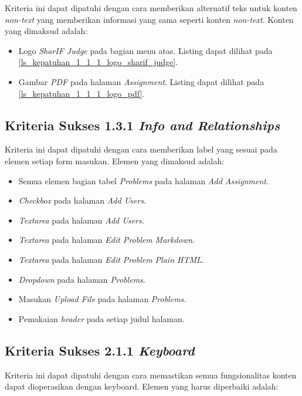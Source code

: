 Kriteria ini dapat dipatuhi dengan cara memberikan alternatif teks untuk konten \textit{non-text} yang memberikan informasi yang sama seperti konten \textit{non-text}. Konten yang dimaksud adalah:

\begin{itemize}
	\item Logo \textit{SharIF Judge} pada bagian menu atas. Listing dapat dilihat pada \ref{ls_kepatuhan_1_1_1_logo_sharif_judge}.
	\item Gambar \textit{PDF} pada halaman \textit{Assignment}. Listing dapat dilihat pada \ref{ls_kepatuhan_1_1_1_logo_pdf}.
\end{itemize}

\subsection{Kriteria Sukses 1.3.1 \textit{Info and Relationships}}
\label{subsec:peningkatan_A_1.3.1}

Kriteria ini dapat dipatuhi dengan cara memberikan label yang sesuai pada elemen setiap form masukan. Elemen yang dimaksud adalah:

\begin{itemize}
	\item Semua elemen bagian tabel \textit{Problems} pada halaman \textit{Add Assignment}.
	\item \textit{Checkbox} pada halaman \textit{Add Users}.
	\item \textit{Textarea} pada halaman \textit{Add Users}.
	\item \textit{Textarea} pada halaman \textit{Edit Problem Markdown}.
	\item \textit{Textarea} pada halaman \textit{Edit Problem Plain HTML}.
	\item \textit{Dropdown} pada halaman \textit{Problems}.
	\item Masukan \textit{Upload File} pada halaman \textit{Problems}.
	\item Pemakaian \textit{header} pada setiap judul halaman.
\end{itemize}

\subsection{Kriteria Sukses 2.1.1 \textit{Keyboard}}
\label{subsec:peningkatan_A_2.1.1}

Kriteria ini dapat dipatuhi dengan cara memastikan semua fungsionalitas konten dapat dioperasikan dengan keyboard. Elemen yang harus diperbaiki adalah:

